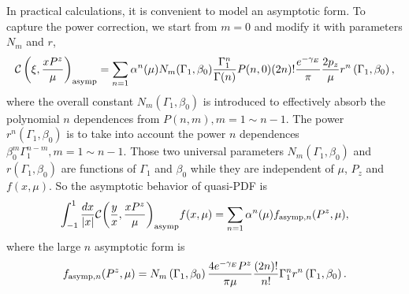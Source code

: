 \documentclass[a4paper,11pt]{article}
\begin{document}
In practical calculations, it is convenient to model an asymptotic form. To capture the power correction, we start from $m=0$ and modify it with parameters $N_m$ and $r$,
\begin{align}
{\cal C}\left(\xi,\frac{xP^z}{\mu}\right)_{\rm asymp} = \sum_{n=1} \alpha^{n}(\mu) N_m(\Gamma_1,\beta_0) \frac{\Gamma _1^{n}}{\Gamma (n)} P(n,0) (2n)! \frac{e^{-\gamma_E}}{\pi} \frac{2p_z}{\mu} r^{n}\left(\Gamma_1,\beta_0\right),
\end{align}
where the overall constant $N_m(\Gamma_1,\beta_0)$ is introduced to effectively absorb the polynomial $n$ dependences from $P(n,m), m=1\sim n-1$. The power $r^{n}\left(\Gamma_1,\beta_0\right)$ is to take into account the power $n$ dependences $\beta _0^m \Gamma _1^{n-m}, m=1\sim n-1$. Those two universal parameters $N_m(\Gamma_1,\beta_0)$ and $r\left(\Gamma_1,\beta_0\right)$ are functions of $\Gamma_1$ and $\beta_0$ while they are independent of $\mu$, $P_z$ and $f(x,\mu)$. So the asymptotic behavior of quasi-PDF is
\begin{align}
\int_{-1}^{1} \frac{dx}{|x|}{\cal C}\bigg(\frac{y}{x},\frac{xP^z}{\mu}\bigg)_{\rm asymp}f(x,\mu) = \sum_{n=1} \alpha^{n}(\mu) f_{{\rm asymp},n}(P^z,\mu),
\end{align}
where the large $n$ asymptotic form is
\begin{align}\label{eq:fasympn}
f_{{\rm asymp},n}(P^z,\mu) = N_m\left(\Gamma_1,\beta _0\right) \frac{4 e^{-\gamma_{E} }  P^z }{\pi  \mu } \frac{(2 n)!}{ n!}   \Gamma_1^n r^{n}\left(\Gamma_1,\beta_0\right).
\end{align}
 
\end{document}
